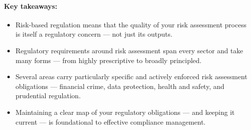 \paragraph{Key takeaways:}
\begin{itemize}
  \item{Risk-based regulation means that the quality of your risk assessment process is itself a regulatory concern — not just its outputs.}
  \item{Regulatory requirements around risk assessment span every sector and take many forms — from highly prescriptive to broadly principled.}
  \item{Several areas carry particularly specific and actively enforced risk assessment obligations — financial crime, data protection, health and safety, and prudential regulation.}
  \item{Maintaining a clear map of your regulatory obligations — and keeping it current — is foundational to effective compliance management.}
\end{itemize}

